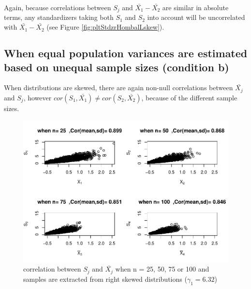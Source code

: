 \documentclass[
  man]{apa6}
\begin{document}
Again, because correlations between \(S_j\) and \(\bar{X_1}-\bar{X_2}\) are similar in absolute terms, any standardizers taking both \(S_1\) and \(S_2\) into account will be uncorrelated with \(\bar{X_1}-\bar{X_2}\) (see Figure \ref{fig:pltStdzrHombalLskew}).

\hypertarget{when-equal-population-variances-are-estimated-based-on-unequal-sample-sizes-condition-b}{%
\subsection{When equal population variances are estimated based on unequal sample sizes (condition b)}\label{when-equal-population-variances-are-estimated-based-on-unequal-sample-sizes-condition-b}}

When distributions are skewed, there are again non-null correlations between \(\bar{X_j}\) and \(S_j\), however \(cor(S_1,\bar{X_1}) \neq cor(S_2,\bar{X_2})\), because of the different sample sizes.

\begin{figure}
\centering
\includegraphics{Correlation_files/figure-latex/Homunbalcorasafctofn1-1.pdf}
\caption{\label{fig:Homunbalcorasafctofn1}correlation between \(S_j\) and \(\bar{X_j}\) when n = 25, 50, 75 or 100 and samples are extracted from right skewed distributions (\(\gamma_1 = 6.32\))}
\end{figure}
\end{document}
